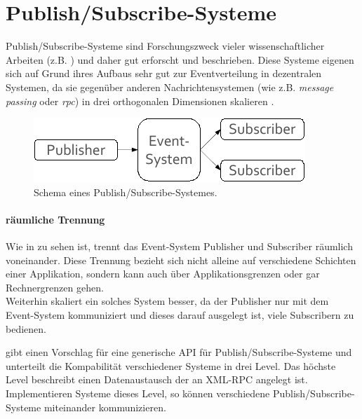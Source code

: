 \section{Publish/Subscribe-Systeme}
\label{chap:grundlagen:pubsub}

Publish/Subscribe-Systeme sind Forschungszweck vieler wissenschaftlicher Arbeiten (z.B. \cite{Banerjee2001Comparative, Liu2003Survey, Muhl2002LargeScale, FiegeSecurity, Castro2002Scribe}) und daher gut erforscht und beschrieben. Diese Systeme eigenen sich auf Grund ihres Aufbaus sehr gut zur Eventverteilung in dezentralen Systemen, da sie gegenüber anderen Nachrichtensystemen (wie z.B. \emph{message passing} oder \emph{rpc}) in drei orthogonalen Dimensionen skalieren \cite{PatrickTh2003Many}.

\begin{figure}[htbp]
\centering
\includegraphics{grafics/pubsub_black_box.pdf}
\caption{Schema eines Publish/Subscribe-Systemes.}
\label{fig:pubsub_black_box}
\end{figure}

\paragraph{räumliche Trennung}
Wie in  zu sehen ist, trennt das Event-System Publisher und Subscriber räumlich voneinander. Diese Trennung bezieht sich nicht alleine auf verschiedene Schichten einer Applikation, sondern kann auch über Applikationsgrenzen oder gar Rechnergrenzen gehen.\\
Weiterhin skaliert ein solches System besser, da der Publisher nur mit dem Event-System kommuniziert und dieses darauf ausgelegt ist, viele Subscribern zu bedienen.

\cite{PiEyKoSh2007-PubSubAPI} gibt einen Vorschlag für eine generische API für Publish/Subscribe-Systeme und unterteilt die Kompabilität verschiedener Systeme in drei Level. Das höchste Level beschreibt einen Datenaustausch der an XML-RPC angelegt ist. Implementieren Systeme dieses Level, so können verschiedene Publish/Subscribe-Systeme miteinander kommunizieren.

